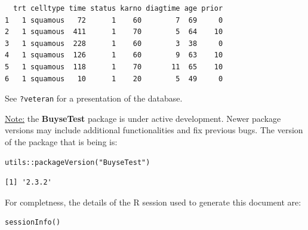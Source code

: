 \documentclass[12pt]{article}
\begin{document}
\begin{verbatim}
  trt celltype time status karno diagtime age prior
1   1 squamous   72      1    60        7  69     0
2   1 squamous  411      1    70        5  64    10
3   1 squamous  228      1    60        3  38     0
4   1 squamous  126      1    60        9  63    10
5   1 squamous  118      1    70       11  65    10
6   1 squamous   10      1    20        5  49     0
\end{verbatim}


See \texttt{?veteran} for a presentation of the database.

\bigskip

\uline{Note:} the \textbf{BuyseTest} package is under active development. Newer
package versions may include additional functionalities and fix
previous bugs. The version of the package that is being is:
\lstset{language=r,label= ,caption= ,captionpos=b,numbers=none}
\begin{lstlisting}
utils::packageVersion("BuyseTest")
\end{lstlisting}

\begin{verbatim}
[1] '2.3.2'
\end{verbatim}


For completness, the details of the R session used to generate this
document are:
\lstset{language=r,label= ,caption= ,captionpos=b,numbers=none}
\begin{lstlisting}
sessionInfo()
\end{lstlisting}
\end{document}
